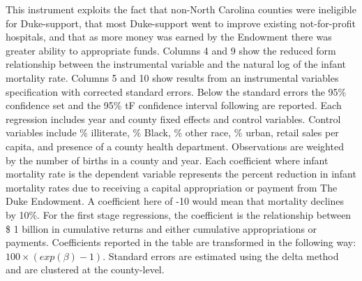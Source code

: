 \documentclass[12pt]{article}
\begin{document}
\begin{landscape}
\begin{table}[!ht]
\begin{adjustbox}{width=0.95\textwidth}
\begin{threeparttable}
{			This instrument exploits the fact that non-North Carolina counties were ineligible for Duke-support, that most Duke-support went to improve existing not-for-profit hospitals, and that as more money was earned by the Endowment there was greater ability to appropriate funds.  
			Columns 4 and 9 show the reduced form relationship between the instrumental variable and the natural log of the infant mortality rate. 
			Columns 5 and 10 show results from an instrumental variables specification with corrected standard errors.  
			Below the standard errors the 95\%  confidence set and the 95\% tF confidence interval following  are reported. 
			Each regression includes year and county fixed effects and control variables. 
            Control variables include \% illiterate, \% Black, \% other race, \% urban, retail sales per capita, and presence of a county health department.
            Observations are weighted by the number of births in a county and year.
            Each coefficient where infant mortality rate is the dependent variable represents the percent reduction in infant mortality rates due to receiving a capital appropriation or payment from The Duke Endowment.
            A coefficient here of -10 would mean that mortality declines by 10\%.
            For the first stage regressions, the coefficient is the relationship between \$ 1 billion in cumulative returns and either cumulative appropriations or payments. 
            Coefficients reported in the table are transformed in the following way: $100\times (exp(\beta) - 1)$.
			Standard errors are estimated using the delta method and are clustered at the county-level.}
                  \end{threeparttable}
     \end{adjustbox}
\end{table}
\end{landscape}
\restoregeometry
\end{document}
